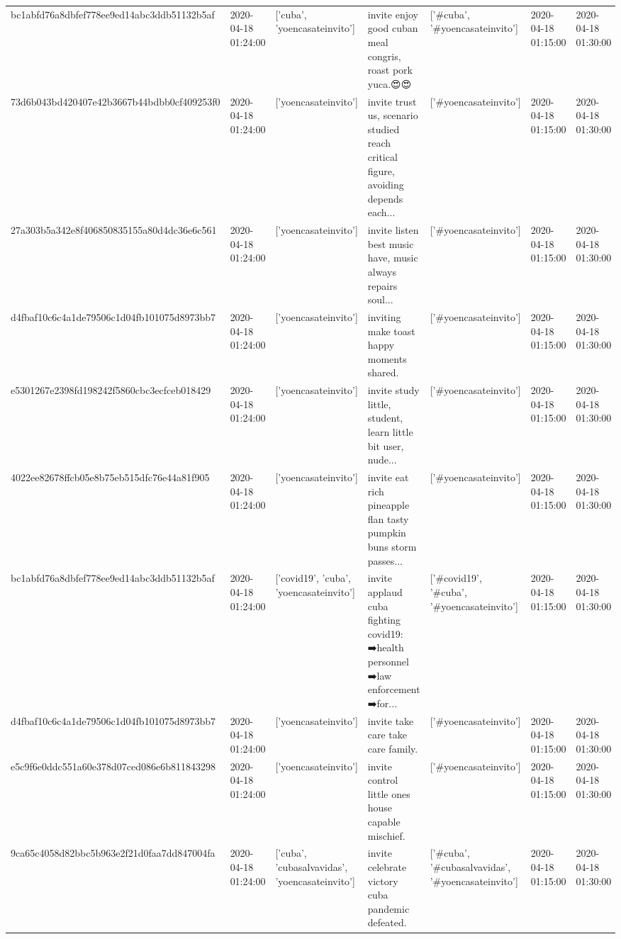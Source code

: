 \begin{tabular}{lllllll}
bc1abfd76a8dbfef778ee9ed14abc3ddb51132b5af & 2020-04-18 01:24:00 & ['cuba', 'yoencasateinvito'] & invite enjoy good cuban meal congris, roast pork yuca.😍😍 & ['#cuba', '#yoencasateinvito'] & 2020-04-18 01:15:00 & 2020-04-18 01:30:00 \\
73d6b043bd420407e42b3667b44bdbb0cf409253f0 & 2020-04-18 01:24:00 & ['yoencasateinvito'] & invite trust us, scenario studied reach critical figure, avoiding depends each... & ['#yoencasateinvito'] & 2020-04-18 01:15:00 & 2020-04-18 01:30:00 \\
27a303b5a342e8f406850835155a80d4dc36e6c561 & 2020-04-18 01:24:00 & ['yoencasateinvito'] & invite listen best music have, music always repairs soul... & ['#yoencasateinvito'] & 2020-04-18 01:15:00 & 2020-04-18 01:30:00 \\
d4fbaf10c6c4a1de79506c1d04fb101075d8973bb7 & 2020-04-18 01:24:00 & ['yoencasateinvito'] & inviting make toast happy moments shared. & ['#yoencasateinvito'] & 2020-04-18 01:15:00 & 2020-04-18 01:30:00 \\
e5301267e2398fd198242f5860cbc3ecfceb018429 & 2020-04-18 01:24:00 & ['yoencasateinvito'] & invite study little, student, learn little bit user, nude... & ['#yoencasateinvito'] & 2020-04-18 01:15:00 & 2020-04-18 01:30:00 \\
4022ee82678ffcb05e8b75eb515dfc76e44a81f905 & 2020-04-18 01:24:00 & ['yoencasateinvito'] & invite eat rich pineapple flan tasty pumpkin buns storm passes... & ['#yoencasateinvito'] & 2020-04-18 01:15:00 & 2020-04-18 01:30:00 \\
bc1abfd76a8dbfef778ee9ed14abc3ddb51132b5af & 2020-04-18 01:24:00 & ['covid19', 'cuba', 'yoencasateinvito'] & invite applaud cuba fighting covid19: ➡️health personnel ➡️law enforcement ➡️for... & ['#covid19', '#cuba', '#yoencasateinvito'] & 2020-04-18 01:15:00 & 2020-04-18 01:30:00 \\
d4fbaf10c6c4a1de79506c1d04fb101075d8973bb7 & 2020-04-18 01:24:00 & ['yoencasateinvito'] & invite take care take care family. & ['#yoencasateinvito'] & 2020-04-18 01:15:00 & 2020-04-18 01:30:00 \\
e5c9f6e0ddc551a60e378d07ced086e6b811843298 & 2020-04-18 01:24:00 & ['yoencasateinvito'] & invite control little ones house capable mischief. & ['#yoencasateinvito'] & 2020-04-18 01:15:00 & 2020-04-18 01:30:00 \\
9ca65c4058d82bbc5b963e2f21d0faa7dd847004fa & 2020-04-18 01:24:00 & ['cuba', 'cubasalvavidas', 'yoencasateinvito'] & invite celebrate victory cuba pandemic defeated. & ['#cuba', '#cubasalvavidas', '#yoencasateinvito'] & 2020-04-18 01:15:00 & 2020-04-18 01:30:00 \\

\end{tabular}
